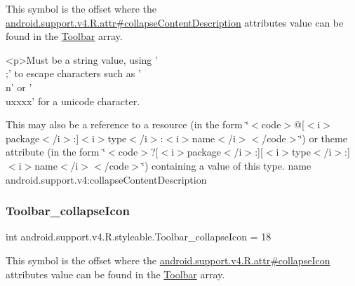 This symbol is the offset where the \hyperlink{classandroid_1_1support_1_1v4_1_1R_1_1attr_ae883fcfe0059a7c95c4b5111529ff972}{android.\+support.\+v4.\+R.\+attr\#collapse\+Content\+Description} attribute\textquotesingle{}s value can be found in the \hyperlink{classandroid_1_1support_1_1v4_1_1R_1_1styleable_a211358a2f951023c7735caea0fb5ae04}{Toolbar} array.

\begin{DoxyVerb}      <p>Must be a string value, using '\\;' to escape characters such as '\\n' or '\\uxxxx' for a unicode character.
\end{DoxyVerb}
 

This may also be a reference to a resource (in the form \char`\"{}$<$code$>$@\mbox{[}$<$i$>$package$<$/i$>$\+:\mbox{]}$<$i$>$type$<$/i$>$\+:$<$i$>$name$<$/i$>$$<$/code$>$\char`\"{}) or theme attribute (in the form \char`\"{}$<$code$>$?\mbox{[}$<$i$>$package$<$/i$>$\+:\mbox{]}\mbox{[}$<$i$>$type$<$/i$>$\+:\mbox{]}$<$i$>$name$<$/i$>$$<$/code$>$\char`\"{}) containing a value of this type.  name android.\+support.\+v4\+:collapse\+Content\+Description \mbox{\label{classandroid_1_1support_1_1v4_1_1R_1_1styleable_adc48ca7e6b4af1cbf953aca1ddd4dc52}} 
\subsubsection{\texorpdfstring{Toolbar\+\_\+collapse\+Icon}{Toolbar\_collapseIcon}}
{\footnotesize\ttfamily int android.\+support.\+v4.\+R.\+styleable.\+Toolbar\+\_\+collapse\+Icon = 18\hspace{0.3cm}{\ttfamily [static]}}

This symbol is the offset where the \hyperlink{classandroid_1_1support_1_1v4_1_1R_1_1attr_a5d0cc1bfeb940bcc6a12235499982d6d}{android.\+support.\+v4.\+R.\+attr\#collapse\+Icon} attribute\textquotesingle{}s value can be found in the \hyperlink{classandroid_1_1support_1_1v4_1_1R_1_1styleable_a211358a2f951023c7735caea0fb5ae04}{Toolbar} array.

